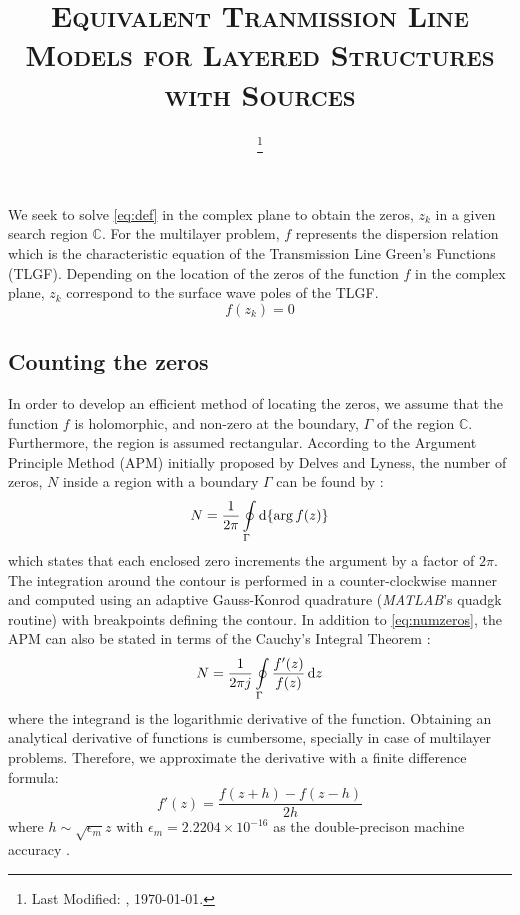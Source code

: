 \documentclass[12pt]{article}
\begin{document}
\title{\textsc{Equivalent Tranmission Line Models for Layered Structures with Sources}\\}
\date{\footnote{Last Modified: \currenttime, \today.}}
\maketitle
%
%
%
We seek to solve \eqref{eq:def} in the complex plane to obtain the zeros, $z_k$ in a given search region $\mathbb{C}$. For the multilayer problem, $f$ represents the dispersion relation which is the characteristic equation of the Transmission Line Green's Functions (TLGF). Depending on the location of the zeros of the function $f$ in the complex plane, $z_k$ correspond to the surface wave poles of the TLGF.
\begin{equation}
  f(z_k) = 0
  \label{eq:def}
\end{equation}
\subsection*{Counting the zeros}
In order to develop an efficient method of locating the zeros, we assume that the function $f$ is holomorphic, and non-zero at the boundary, $\Gamma$ of the region $\mathbb{C}$. Furthermore, the region is assumed rectangular. According to the Argument Principle Method (APM) initially proposed by Delves and Lyness, the number of zeros, $N$ inside a region with a boundary $\Gamma$ can be found by \cite{Delves1967c,Carpentier1982c,Gillan2006c}:
%
\begin{equation}
  N = \frac{1}{2 \pi} \oint \limits_{\Gamma} \dif {\{ \arg f(z)\} }
  \label{eq:numzeros}
\end{equation}
%
which states that each enclosed zero increments the argument by a factor of $2 \pi$. The integration around the contour is performed in a counter-clockwise manner and computed using an adaptive Gauss-Konrod quadrature (\emph{MATLAB}'s quadgk routine) with breakpoints defining the contour. In addition to \eqref{eq:numzeros}, the APM can also be stated in terms of the Cauchy's Integral Theorem \cite[pg. 71]{Krantz1999}:
%
\begin{equation}
  N = \frac{1}{2 \pi j} \oint \limits_{\Gamma} \frac{f'(z)}{f(z)} \dif z
  \label{eq:cauchyth}
\end{equation}
%
where the integrand is the logarithmic derivative of the function. Obtaining an analytical derivative of functions is cumbersome, specially in case of multilayer problems. Therefore, we approximate the derivative with a finite difference formula:
%
\begin{equation}
  f'(z) = \frac{f(z + h) - f(z - h)}{2 h}
  \label{eq:FD}
\end{equation}
%
where $h \sim \sqrt{\epsilon_m}z$ with $\epsilon_m = 2.2204 \times 10^{-16}$ as the double-precison machine accuracy \cite[pg. 230]{press2007numerical}.
%
\end{document}
